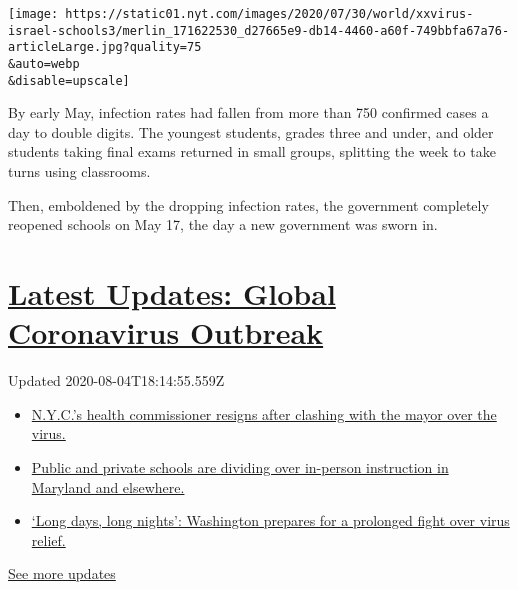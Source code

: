 \texttt{[image: https://static01.nyt.com/images/2020/07/30/world/xxvirus-israel-schools3/merlin\_171622530\_d27665e9-db14-4460-a60f-749bbfa67a76-articleLarge.jpg?quality=75\\\&auto=webp\\\&disable=upscale]}

By early May, infection rates had fallen from more than 750 confirmed
cases a day to double digits. The youngest students, grades three and
under, and older students taking final exams returned in small groups,
splitting the week to take turns using classrooms.

Then, emboldened by the dropping infection rates, the government
completely reopened schools on May 17, the day a new government was
sworn in.

\hypertarget{latest-updates-global-coronavirus-outbreak}{%
\section{\texorpdfstring{\href{https://www.nytimes.com/2020/08/04/world/coronavirus-cases.html?action=click\&pgtype=Article\&state=default\&region=MAIN_CONTENT_1\&context=storylines_live_updates}{Latest
Updates: Global Coronavirus
Outbreak}}{Latest Updates: Global Coronavirus Outbreak}}\label{latest-updates-global-coronavirus-outbreak}}

Updated 2020-08-04T18:14:55.559Z

\begin{itemize}
\tightlist
\item
  \href{https://www.nytimes.com/2020/08/04/world/coronavirus-cases.html?action=click\&pgtype=Article\&state=default\&region=MAIN_CONTENT_1\&context=storylines_live_updates\#link-4d1eafa8}{N.Y.C.'s
  health commissioner resigns after clashing with the mayor over the
  virus.}
\item
  \href{https://www.nytimes.com/2020/08/04/world/coronavirus-cases.html?action=click\&pgtype=Article\&state=default\&region=MAIN_CONTENT_1\&context=storylines_live_updates\#link-18bf040e}{Public
  and private schools are dividing over in-person instruction in
  Maryland and elsewhere.}
\item
  \href{https://www.nytimes.com/2020/08/04/world/coronavirus-cases.html?action=click\&pgtype=Article\&state=default\&region=MAIN_CONTENT_1\&context=storylines_live_updates\#link-6b644638}{`Long
  days, long nights': Washington prepares for a prolonged fight over
  virus relief.}
\end{itemize}

\href{https://www.nytimes.com/2020/08/04/world/coronavirus-cases.html?action=click\&pgtype=Article\&state=default\&region=MAIN_CONTENT_1\&context=storylines_live_updates}{See
more updates}

